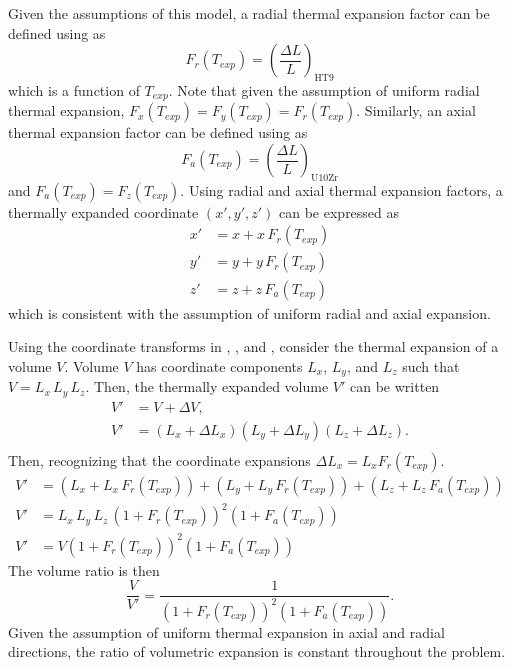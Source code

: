   Given the assumptions of this model, a radial thermal expansion factor can be
  defined using  as
  \begin{equation}
    \label{eq:lef_r}
    F_r(T_{exp}) = \left(\frac{\Delta L}{L}\right)_{\text{HT9}}
  \end{equation}
  which is a function of $T_{exp}$. Note that given the assumption of uniform
  radial thermal expansion, ${F_x(T_{exp}) = F_y(T_{exp}) = F_r(T_{exp})}$.
  Similarly, an axial thermal expansion factor can be defined using
   as 
  \begin{equation}
    \label{eq:lef_a}
    F_a(T_{exp}) = \left(\frac{\Delta L}{L}\right)_{\text{U10Zr}}
  \end{equation}
  and $F_a(T_{exp}) = F_z(T_{exp})$. Using radial and axial thermal expansion
  factors, a thermally expanded coordinate $(x',y',z')$ can be expressed as
  \begin{align}
    \label{eq:expand_x}
    x' &= x + x \, F_r(T_{exp}) \\
    \label{eq:expand_y}
    y' &= y + y \, F_r(T_{exp}) \\
    \label{eq:expand_z}
    z' &= z + z \, F_a(T_{exp})
  \end{align}
  which is consistent with the assumption of uniform radial and axial expansion.

  Using the coordinate transforms in , , and
  , consider the thermal expansion of a volume $V$. Volume $V$
  has coordinate components $L_x$, $L_y$, and $L_z$ such that 
  ${V = L_x \, L_y \, L_z}$. Then, the thermally expanded volume $V'$ can be
  written
  \begin{align}
    V' &= V + \Delta V, \\
    V' &= (L_x + \Delta L_x) (L_y + \Delta L_y) (L_z + \Delta L_z). \\
  \end{align}
  Then, recognizing that the coordinate expansions $\Delta L_x = L_x
  F_r(T_{exp})$.
  \begin{align}
    V' &= (L_x + L_x \, F_r(T_{exp})) + (L_y + L_y \, F_r(T_{exp})) + 
      (L_z + L_z \, F_a(T_{exp})) \\
    V' &= L_x \, L_y \, L_z \, (1 + F_r(T_{exp}))^2 (1+F_a(T_{exp})) \\
    V' &= V (1 + F_r(T_{exp}))^2 (1+F_a(T_{exp}))
  \end{align}
  The volume ratio is then
  \begin{equation}
    \label{eq:volume_ratio}
    \frac{V}{V'} = \frac{1}{(1+F_r(T_{exp}))^2 (1+F_a(T_{exp}))}.
  \end{equation}
  Given the assumption of uniform thermal expansion in axial and radial
  directions, the ratio of volumetric expansion is constant throughout the
  problem.

